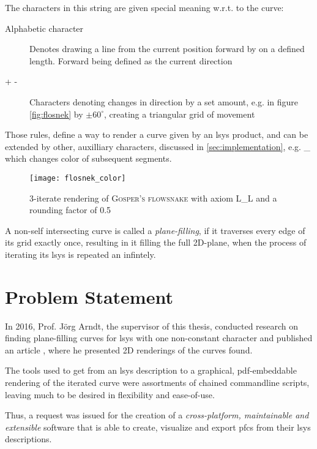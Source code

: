 The characters in this string are given special meaning w.r.t. to the curve:
\begin{description}
	\item[Alphabetic character] Denotes drawing a line from the current position forward by on a defined length. Forward being defined as the current direction
	\item[+ -] Characters denoting changes in direction by a set amount, e.g. in figure \ref{fig:flosnek} by $\pm60^\circ$, creating a triangular grid of movement
\end{description}

Those rules, define a way to render a curve given by an \gls{lsys} \gls{product}, and can be extended by other, auxilliary characters, discussed in \ref{sec:implementation}, e.g. \_ which changes color of subsequent segments.

\begin{figure}[hb]
	\centering
	\texttt{[image: flosnek\_color]}
	\caption{3-iterate rendering of \textsc{Gosper's flowsnake} with axiom \textrm{L\_L} and a rounding factor of 0.5}
\end{figure}
\label{def:pfc}

\begin{definition}
A non-self intersecting curve is called a \textit{plane-filling}, if it traverses every edge of its grid exactly once, resulting in it filling the full 2D-plane, when the process of iterating its \gls{lsys} is repeated an infintely.
\end{definition}

\section{Problem Statement}
In 2016, Prof. Jörg Arndt, the supervisor of this thesis, conducted research on finding plane-filling curves for \gls{lsys} with one non-constant character and published an article \citep{Arndt2016}, where he presented 2D renderings of the curves found.

The tools used to get from an \gls{lsys} description to a graphical, pdf-embeddable rendering of the iterated curve were assortments of chained commandline scripts, leaving much to be desired in flexibility and ease-of-use.

Thus, a request was issued for the creation of a \emph{cross-platform, maintainable and extensible} software that is able to create, visualize and export \gls{pfc}s from their \gls{lsys} descriptions.

